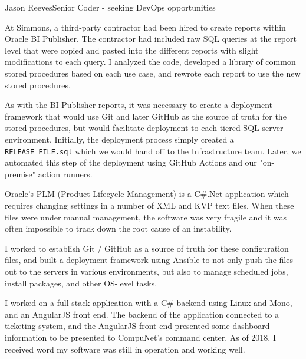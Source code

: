 \documentclass{article}
\begin{document}
\begin{cv}[avatar]{Jason Reeves}{Senior Coder - seeking DevOps opportunities}
\begin{cvevent}[2018-2020]
    At Simmons, a third-party contractor had been hired to create reports within Oracle BI Publisher.  The contractor had included raw SQL queries at the report level that were copied and pasted into the different reports with slight modifications to each query.  I analyzed the code, developed a library of common stored procedures based on each use case, and rewrote each report to use the new stored procedures.

    \vspace*{3mm}
    As with the BI Publisher reports, it was necessary to create a deployment framework that would use Git and later GitHub as the source of truth for the stored procedures, but would facilitate deployment to each tiered SQL server environment.  Initially, the deployment process simply created a \texttt{RELEASE\_FILE.sql} which we would hand off to the Infrastructure team.  Later, we automated this step of the deployment using GitHub Actions and our "on-premise" action runners.
    \vspace*{5mm}
\end{cvevent}

\begin{cvevent}[2018-2020]
    Oracle's PLM (Product Lifecycle Management) is a C\#.Net application which requires changing settings in a number of XML and KVP text files.  When these files were under manual management, the software was very fragile and it was often impossible to track down the root cause of an instability.

    \vspace*{3mm}
    I worked to establish Git / GitHub as a source of truth for these configuration files, and built a deployment framework using Ansible to not only push the files out to the servers in various environments, but also to manage scheduled jobs, install packages, and other OS-level tasks.  
    \vspace*{5mm}
\end{cvevent}

\begin{cvevent}[Sep 2016][Sep 2017]
  I worked on a full stack application with a C\# backend using Linux and Mono, and an AngularJS front end. The backend of the application connected to a ticketing system, and the AngularJS front end presented some dashboard information to be presented to CompuNet's command center. As of 2018, I received word my software was still in operation and working well.
  

\end{cvevent}
\end{cv}
\end{document}
